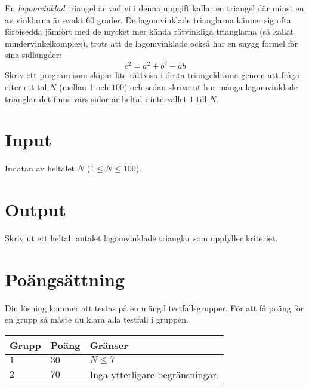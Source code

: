 En \emph{lagomvinklad} triangel är vad vi i denna uppgift kallar en triangel där minst en av vinklarna är exakt 60 grader. De lagomvinklade trianglarna känner sig ofta förbisedda jämfört med de mycket mer kända rätvinkliga trianglarna (så kallat mindervinkelkomplex), trots att de lagomvinklade också har en snygg formel för sina sidlängder:
\begin{equation*}
	c^2 = a^2 + b^2 - ab
\end{equation*}
Skriv ett program som skipar lite rättvisa i detta triangeldrama genom att fråga efter ett tal $N$ (mellan $1$ och $100$) och sedan skriva ut hur många lagomvinklade trianglar det finns vars sidor är heltal i intervallet $1$ till $N$.

\section*{Input}
Indatan av heltalet $N$ ($1 \leq N \leq 100$).

\section*{Output}
Skriv ut ett heltal: antalet lagomvinklade trianglar som uppfyller kriteriet.

\section*{Poängsättning}
Din lösning kommer att testas på en mängd testfallsgrupper.
För att få poäng för en grupp så måste du klara alla testfall i gruppen.

\noindent
\begin{tabular}{| l | l | p{12cm} |}
  \hline
  \textbf{Grupp} & \textbf{Poäng} & \textbf{Gränser} \\ \hline
  $1$    & $30$          & $N \leq 7$  \\ \hline
  $2$    & $70$          & Inga ytterligare begränsningar.  \\ \hline
\end{tabular}

